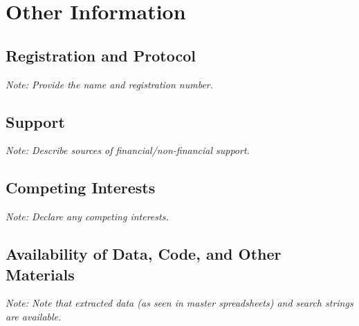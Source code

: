 
\section{Other Information}

\subsection{Registration and Protocol}
\textit{Note: Provide the name and registration number.}

\subsection{Support}
\textit{Note: Describe sources of financial/non-financial support.}

\subsection{Competing Interests}
\textit{Note: Declare any competing interests.}

\subsection{Availability of Data, Code, and Other Materials}
\textit{Note: Note that extracted data (as seen in master spreadsheets) and search strings are available.}
